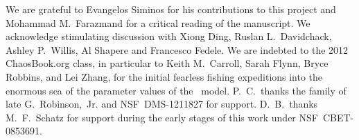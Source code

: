 \documentclass[aip,cha,
reprint,
secnumarabic,
nofootinbib, tightenlines,
nobibnotes, showkeys, showpacs,
superscriptaddress,
]{revtex4-1}
\begin{document}
\begin{acknowledgments}
We are grateful to Evangelos Siminos for his contributions to this project
and Mohammad M.~Farazmand for a critical reading of the manuscript.
We acknowledge stimulating discussion with
Xiong Ding,
Ruslan L.~Davidchack,
Ashley P.~Willis,
Al Shapere
and
Francesco Fedele.
We are indebted to the 2012 ChaosBook.org class, in particular to
Keith M.~Carroll,
Sarah Flynn,
Bryce Robbins,
and
Lei Zhang,
for the initial fearless fishing expeditions into the enormous sea of the
parameter values of the \twomode\ model.
P.~C.\ thanks the family of late G.~Robinson,~Jr.
and
NSF~DMS-1211827 for support. D.~B.\ thanks M.~F.\ Schatz for support during
the early stages of this work under NSF~CBET-0853691.
\end{acknowledgments}

\appendix
%
%


\end{document}
